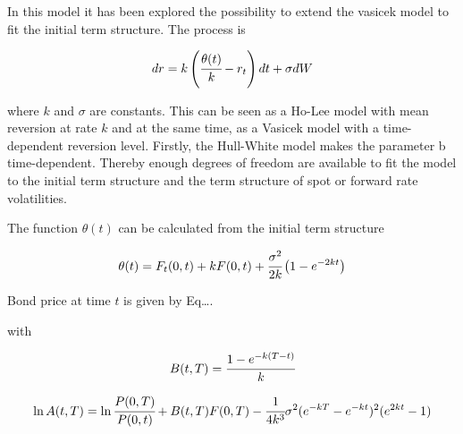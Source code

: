 In this model it has been explored the possibility to extend the vasicek
model to fit the initial term structure. The process is

\[dr = k\left(\cfrac{\theta(t)}{k}-r_t \right)dt + \sigma dW\]

where \(k\) and \(\sigma\) are constants. This can be seen as a Ho-Lee
model with mean reversion at rate \(k\) and at the same time, as a
Vasicek model with a time-dependent reversion level.
Firstly, the Hull-White model makes the parameter b time-dependent. Thereby enough degrees of freedom are available to fit the model to the initial term structure and the term structure of spot or forward rate volatilities.

The function \(\theta(t)\) can be calculated from the initial term
structure

\[\theta(t)=F_t(0,t)+kF(0,t)+\cfrac{\sigma^2}{2k}\left(1-e^{-2kt}\right)\]

Bond price at time \(t\) is given by Eq\ldots{}.

with

\[B(t,T)=\cfrac{1-e^{-k(T-t)}}{k}\]

\[\ln A(t,T)=\ln\cfrac{P(0,T)}{P(0,t)}+B(t,T)F(0,T)-\cfrac{1}{4k^3}\sigma^{2}(e^{-kT}-e^{-kt})^2(e^{2kt}-1)\]

